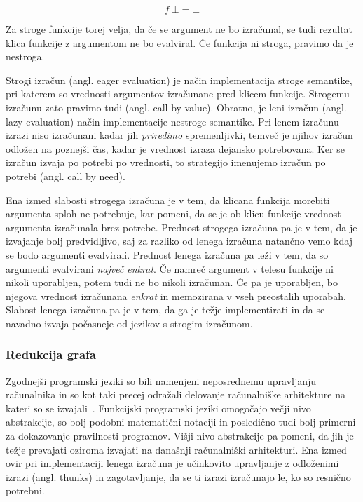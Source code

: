 $$ f \: \bot = \bot $$

Za stroge funkcije torej velja, da če se argument ne bo izračunal, se tudi rezultat klica funkcije z argumentom ne  bo evalviral. Če funkcija ni stroga, pravimo da je nestroga.

Strogi izračun (angl. eager evaluation) je način implementacija stroge semantike, pri katerem so vrednosti argumentov izračunane pred klicem funkcije. Strogemu izračunu zato pravimo tudi  (angl. call by value). Obratno, je leni izračun (angl. lazy evaluation) način implementacije nestroge semantike. Pri lenem izračunu izrazi niso izračunani kadar jih \textit{priredimo} spremenljivki, temveč je njihov izračun odložen na poznejši čas, kadar je vrednost izraza dejansko potrebovana. Ker se izračun izvaja po potrebi po vrednosti, to strategijo imenujemo izračun po potrebi (angl. call by need).

Ena izmed slabosti strogega izračuna je v tem, da klicana funkcija morebiti argumenta sploh ne potrebuje, kar pomeni, da se je ob klicu funkcije vrednost argumenta izračunala brez potrebe. Prednost strogega izračuna pa je v tem, da je izvajanje bolj predvidljivo, saj za razliko od lenega izračuna natančno vemo kdaj se bodo argumenti evalvirali. Prednost lenega izračuna pa leži v tem, da so argumenti evalvirani \textit{največ enkrat}. Če namreč argument v telesu funkcije ni nikoli uporabljen, potem tudi ne bo nikoli izračunan. Če pa je uporabljen, bo njegova vrednost izračunana \textit{enkrat} in memozirana v vseh preostalih uporabah. Slabost lenega izračuna pa je v tem, da ga je težje implementirati in da se navadno izvaja počasneje od jezikov s strogim izračunom.


\subsubsection{Redukcija grafa}

Zgodnejši programski jeziki so bili namenjeni neposrednemu upravljanju ra\-ču\-nal\-ni\-ka in so kot taki precej odražali delovanje računalniške arhitekture na kateri so se izvajali~\cite{10.1145/72551.72554}. Funkcijski programski jeziki omogočajo večji nivo abstrakcije, so bolj podobni matematični notaciji in posledično tudi bolj primerni za dokazovanje pravilnosti programov. Višji nivo abstrakcije pa pomeni, da jih je težje prevajati oziroma izvajati na današnji računalniški arhitekturi. Ena izmed ovir pri implementaciji lenega izračuna je učinkovito upravljanje z odloženimi izrazi (angl. thunks) in zagotavljanje, da se ti izrazi izračunajo le, ko so resnično potrebni.

